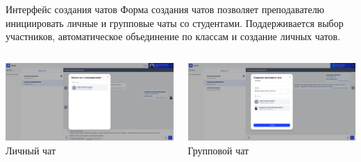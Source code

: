 \documentclass[aspectratio=169]{beamer}
\begin{document}
\begin{frame}{Интерфейс создания чатов}
\small
\justifying
Форма создания чатов позволяет преподавателю инициировать личные и групповые чаты со студентами. Поддерживается выбор участников, автоматическое объединение по классам и создание личных чатов.

\vspace{1em}

\begin{columns}
  \begin{column}{0.48\textwidth}
    \centering
    \includegraphics[width=\linewidth]{static/ChatsStudentCreateChat.png} \\
    \small Личный чат
  \end{column}
  \begin{column}{0.48\textwidth}
    \centering
    \includegraphics[width=\linewidth]{static/ChatsTeacherCreateGroupChat.png} \\
    \small Групповой чат
  \end{column}
\end{columns}
\end{frame}
\end{document}
